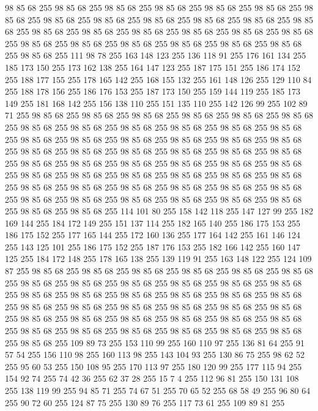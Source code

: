 98 85 68 255 98 85 68 255 98 85 68 255 98 85 68 255 98 85 68 255 98 85 68 255 98 85 68 255 98 85 68 255 98 85 68 255 98 85 68 255 98 85 68 255 98 85 68 255 98 85 68 255 98 85 68 255 98 85 68 255 98 85 68 255 98 85 68 255 98 85 68 255 98 85 68 255 98 85 68 255 98 85 68 255 98 85 68 255 98 85 68 255 98 85 68 255 98 85 68 255 98 85 68 255 111 98 78 255 163 148 123 255 136 118 91 255 176 161 134 255 185 173 150 255 173 162 138 255 164 147 123 255 187 175 151 255 186 174 152 255 188 177 155 255 178 165 142 255 168 155 132 255 161 148 126 255 129 110 84 255 188 178 156 255 186 176 153 255 187 173 150 255 159 144 119 255 185 173 149 255 181 168 142 255 156 138 110 255 151 135 110 255 142 126 99 255 102 89 71 255 98 85 68 255 98 85 68 255 98 85 68 255 98 85 68 255 98 85 68 255 98 85 68 255 98 85 68 255 98 85 68 255 98 85 68 255 98 85 68 255 98 85 68 255 98 85 68 255 98 85 68 255 98 85 68 255
98 85 68 255 98 85 68 255 98 85 68 255 98 85 68 255 98 85 68 255 98 85 68 255 98 85 68 255 98 85 68 255 98 85 68 255 98 85 68 255 98 85 68 255 98 85 68 255 98 85 68 255 98 85 68 255 98 85 68 255 98 85 68 255 98 85 68 255 98 85 68 255 98 85 68 255 98 85 68 255 98 85 68 255 98 85 68 255 98 85 68 255 98 85 68 255 98 85 68 255 98 85 68 255 98 85 68 255 98 85 68 255 98 85 68 255 98 85 68 255 98 85 68 255 98 85 68 255 98 85 68 255 98 85 68 255 98 85 68 255 98 85 68 255 114 101 80 255 158 142 118 255 147 127 99 255 182 169 144 255 184 172 149 255 151 137 114 255 182 165 140 255 186 175 153 255 186 175 152 255 177 165 144 255 172 160 136 255 177 164 142 255 161 146 124 255 143 125 101 255 186 175 152 255 187 176 153 255 182 166 142 255 160 147 125 255 184 172 148 255 178 165 138 255 139 119 91 255 163 148 122 255 124 109 87 255 98 85 68 255 98 85 68 255 98 85 68 255 98 85 68 255 98 85 68 255
98 85 68 255 98 85 68 255 98 85 68 255 98 85 68 255 98 85 68 255 98 85 68 255 98 85 68 255 98 85 68 255 98 85 68 255 98 85 68 255 98 85 68 255 98 85 68 255 98 85 68 255 98 85 68 255 98 85 68 255 98 85 68 255 98 85 68 255 98 85 68 255 98 85 68 255 98 85 68 255 98 85 68 255 98 85 68 255 98 85 68 255 98 85 68 255 98 85 68 255 98 85 68 255 98 85 68 255 98 85 68 255 98 85 68 255 98 85 68 255 98 85 68 255 98 85 68 255 109 89 73 255 153 110 99 255 160 110 97 255 136 81 64 255 91 57 54 255 156 110 98 255 160 113 98 255 143 104 93 255 130 86 75 255 98 62 52 255 95 60 53 255 150 108 95 255 170 113 97 255 180 120 99 255 177 115 94 255 154 92 74 255 74 42 36 255 62 37 28 255 15 7 4 255 112 96 81 255 150 131 108 255 138 119 99 255 94 85 71 255 74 67 51 255 70 65 52 255 68 58 49 255 96 80 64 255 90 72 60 255 124 87 75 255 130 89 76 255 117 73 61 255 109 89 81 255
